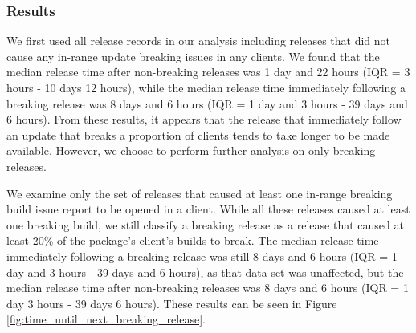 \subsubsection{Results}
We first used all release records in our analysis including releases that did not cause any in-range update breaking issues in any clients. We found that the median release time after non-breaking releases was 1 day and 22 hours (IQR = 3 hours - 10 days 12 hours), while the median release time immediately following a breaking release was 8 days and 6 hours (IQR = 1 day and 3 hours - 39 days and 6 hours). From these results, it appears that the release that immediately follow an update that breaks a proportion of clients tends to take longer to be made available. However, we choose to perform further analysis on only breaking releases.
\par
We examine only the set of releases that caused at least one in-range breaking build issue report to be opened in a client. While all these releases caused at least one breaking build, we still classify a breaking release as a release that caused at least 20\% of the package's client's builds to break. The median release time immediately following a breaking release was still 8 days and 6 hours (IQR = 1 day and 3 hours - 39 days and 6 hours), as that data set was unaffected, but the median release time after non-breaking releases was 8 days and 6 hours (IQR = 1 day 3 hours - 39 days 6 hours). These results can be seen in Figure \ref{fig:time_until_next_breaking_release}.

\newline
\par
{}
